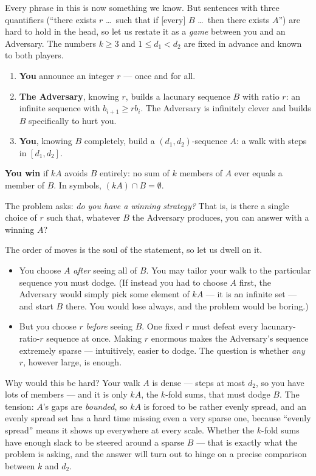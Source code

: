 \documentclass[11pt,reqno]{amsart}
\theoremstyle{plain}
\theoremstyle{definition}
\theoremstyle{remark}
\begin{document}
Every phrase in this is now something we know. But sentences with three quantifiers
(``there exists $r$ \dots\ such that if [every] $B$ \dots\ then there exists $A$'')
are hard to hold in the head, so let us restate it as a \emph{game} between you and an
Adversary. The numbers $k \ge 3$ and $1 \le d_1 < d_2$ are fixed in advance and known
to both players.

\begin{enumerate}
\item \textbf{You} announce an integer $r$ --- once and for all.
\item \textbf{The Adversary}, knowing $r$, builds a lacunary sequence $B$ with ratio
      $r$: an infinite sequence with $b_{i+1} \ge r b_i$. The Adversary is infinitely
      clever and builds $B$ specifically to hurt you.
\item \textbf{You}, knowing $B$ completely, build a $(d_1,d_2)$-sequence $A$: a walk
      with steps in $[d_1, d_2]$.
\end{enumerate}

\noindent\textbf{You win} if $kA$ avoids $B$ entirely: no sum of $k$ members of $A$
ever equals a member of $B$. In symbols, $(kA) \cap B = \emptyset$.

The problem asks: \emph{do you have a winning strategy?} That is, is there a single
choice of $r$ such that, whatever $B$ the Adversary produces, you can answer with a
winning $A$?

The order of moves is the soul of the statement, so let us dwell on it.

\begin{itemize}
\item You choose $A$ \emph{after} seeing all of $B$. You may tailor your walk to the
      particular sequence you must dodge. (If instead you had to choose $A$ first, the
      Adversary would simply pick some element of $kA$ --- it is an infinite set ---
      and start $B$ there. You would lose always, and the problem would be boring.)
\item But you choose $r$ \emph{before} seeing $B$. One fixed $r$ must defeat every
      lacunary-ratio-$r$ sequence at once. Making $r$ enormous makes the Adversary's
      sequence extremely sparse --- intuitively, easier to dodge. The question is
      whether \emph{any} $r$, however large, is enough.
\end{itemize}

Why would this be hard? Your walk $A$ is dense --- steps at most $d_2$, so you have
lots of members --- and it is only $kA$, the $k$-fold sums, that must dodge $B$. The
tension: $A$'s gaps are \emph{bounded}, so $kA$ is forced to be rather evenly spread,
and an evenly spread set has a hard time missing even a very sparse one, because
``evenly spread'' means it shows up everywhere at every scale. Whether the $k$-fold
sums have enough slack to be steered around a sparse $B$ --- that is exactly what the
problem is asking, and the answer will turn out to hinge on a precise comparison
between $k$ and $d_2$.
\end{document}
